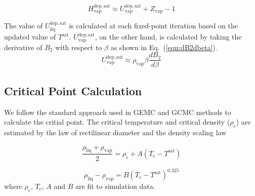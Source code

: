\documentclass[5p,times]{elsarticle}
\begin{document}
\begin{equation}
H^{\mathrm{dep,sat}}_\mathrm{vap} \approx U^{\mathrm{dep, sat}}_\mathrm{vap}+Z_\mathrm{vap} - 1
\label{eqn:HsatVap}
\end{equation}

The value of $U^{\mathrm{dep, sat}}_\mathrm{liq}$ is calculated at each fixed-point iteration based on the updated value of $T^{\mathrm{sat}}$. $U^{\mathrm{dep, sat}}_\mathrm{vap}$, on the other hand, is calculated by taking the derivative of $B_2$ with respect to $\beta$ as shown in Eq.~(\ref{eqn:dB2dbeta}).
\begin{equation}
U^{\mathrm{dep, sat}}_\mathrm{vap}\approx \rho_{\mathrm{vap}} \beta \frac{dB_2}{d\beta}
\label{eqn:dB2dbeta}
\end{equation}

\subsection{Critical Point Calculation}\label{sec:PcCalc}
We follow the standard approach used in GEMC and GCMC methods to calculate the critial point. The critical temperature and critical density ($\rho_\mathrm{c}$) are estimated by the law of rectilinear diameter \cite{Rowlinson1982} and the density scaling law \cite{Rowlinson2013}

\begin{equation}
\frac{\rho_{\mathrm{liq}} +\rho_{\mathrm{vap}}}{2}=\rho_\mathrm{c}+A(T_\mathrm{c}-T^{\mathrm{sat}})
\label{eqn:rectilinearLaw}
\end{equation}

\begin{equation}
\rho_{\mathrm{liq}} -\rho_{\mathrm{vap}}=B(T_\mathrm{c}-T^{\mathrm{sat}})^{0.325}
\label{eqn:scalingLaw}
\end{equation}
where $\rho_\mathrm{c}$, $ T_\mathrm{c}$, $A$ and $B$ are fit to simulation data.

			
\end{document}
